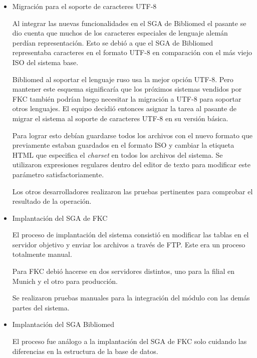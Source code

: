 \begin{itemize}

\item Migración para el soporte de caracteres UTF-8

Al integrar las nuevas funcionalidades en el SGA de Bibliomed el pasante se dio cuenta que muchos de los caracteres especiales de lenguaje alemán perdían representación. Esto se debió a que el SGA de Bibliomed representaba caracteres en el formato UTF-8 en comparación con el más viejo ISO del sistema base.

Bibliomed al soportar el lenguaje ruso usa la mejor opción UTF-8. Pero mantener este esquema significaría que los próximos sistemas vendidos por FKC también podrían luego necesitar la migración a UTF-8 para soportar otros lenguajes. El equipo decidió entonces asignar la tarea al pasante de migrar el sistema al soporte de caracteres UTF-8 en su versión básica.

Para lograr esto debían guardarse todos los archivos con el nuevo formato que previamente estaban guardados en el formato ISO y cambiar la etiqueta \gls{HTML} que especifica el \emph{charset} en todos los archivos del sistema. Se utilizaron expresiones regulares dentro del editor de texto para modificar este parámetro satisfactoriamente.

Los otros desarrolladores realizaron las pruebas pertinentes para comprobar el resultado de la operación.

\item Implantación del SGA de FKC

El proceso de implantación del sistema consistió en modificar las tablas en el servidor objetivo y enviar los archivos a través de \gls{FTP}. Este era un proceso totalmente manual.

Para FKC debió hacerse en dos servidores distintos, uno para la filial en Munich y el otro para producción.

Se realizaron pruebas manuales para la integración del módulo con las demás partes del sistema.

\item Implantación del SGA Bibliomed

El proceso fue análogo a la implantación del SGA de FKC solo cuidando las diferencias en la estructura de la base de datos.

\end{itemize}


